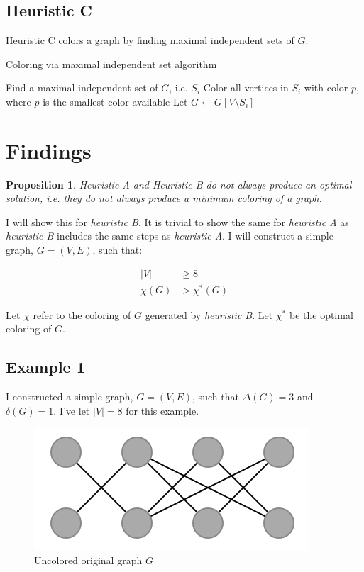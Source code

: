 \documentclass{article}
\newtheorem{prop}{Proposition}
\theoremstyle{definition}
\begin{document}
\subsection*{Heuristic C}

Heuristic C colors a graph by finding maximal independent sets of \(G\).

\begin{algorithm}
\caption{Coloring via maximal independent set algorithm}
\begin{algorithmic}[1]
\State Find a maximal independent set of $G$, i.e. $S_i$
\State Color all vertices in $S_i$ with color $p$, where $p$ is the smallest color available
\State Let $G \leftarrow G[V \setminus S_i ] $
\EndWhile
\end{algorithmic}
\end{algorithm}

\newpage

\section*{Findings}

\begin{prop}
Heuristic A and Heuristic B do not always produce an optimal solution, i.e. they do not always produce a minimum coloring of a graph.
\end{prop}

I will show this for \emph{heuristic B}. It is trivial to show the same for \emph{heuristic A} as \emph{heuristic B} includes the same steps as \emph{heuristic A}. I will construct a simple graph, \(G = (V, E)\), such that:

\begin{align}
|V| &\geq 8 \\
\chi(G) &> \chi^{*}(G)
\end{align}

Let \(\chi\) refer to the coloring of \(G\) generated by \emph{heuristic B}. Let \(\chi^{*}\) be the optimal coloring of \(G\).

\subsection*{Example 1}
I constructed a simple graph, \(G = (V, E)\), such that \(\Delta(G) = 3\) and \(\delta(G) = 1\). I've let \(|V| = 8\) for this example.

\begin{figure}[H]
\centering
\includegraphics[scale=0.6]{images/graph-1.png}
\caption{Uncolored original graph \(G\)}
\end{figure}
\end{document}
